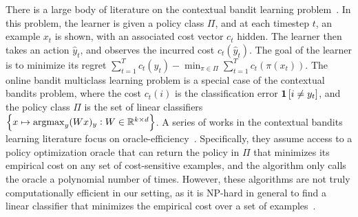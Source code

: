 

There is a large body of literature on the contextual bandit learning
problem~\citep{Auer-2003, Langford-Zhang-2008}. In this problem, the learner is
given a policy class $\Pi$, and at each timestep $t$, an example $x_t$ is shown,
with an associated cost vector $c_t$ hidden. The learner then takes an action
$\widehat{y}_t$, and observes the incurred cost $c_t(\widehat{y}_t)$.
The goal of the learner is to minimize its regret $\sum_{t=1}^T c_t(\widehat{y}_t) - \min_{\pi \in \Pi}
\sum_{t=1}^T c_t(\pi(x_t))$. The online bandit multiclass learning problem is a
special case of the contextual bandits problem, where the cost $c_t(i)$ is the
classification error $\mathbf{1}\left[i \neq y_t \right]$, and the policy class $\Pi$ is the set of
linear classifiers $\cbr{x \mapsto \argmax_y (Wx)_y: W \in \R^{k \times d}}$. A
series of works in the contextual bandits learning literature focus on
oracle-efficiency~\citep{Dudik-Hsu-Kale-Karampatziakis-Langford-Reyzin-Zhang-2011,
Agarwal-Hsu-Kale-Langford-Li-Schapire-2014, Rakhlin-Sridharan-2016,
Syrgkanis-Krishnamurthy-Schapire-2016,
Syrgkanis-Luo-Krishnamurthy-Schapire-2016}. Specifically, they assume access to
a policy optimization oracle that can return the policy in $\Pi$ that minimizes its
empirical cost on any set of cost-sensitive examples, and the algorithm only calls the oracle a
polynomial number of times. However, these algorithms are not truly
computationally efficient in our setting, as it is NP-hard in general to find a
linear classifier that minimizes the empirical cost over a set of
examples~\citep{Arora-Babai-Stern-Sweedyk-1997}.

